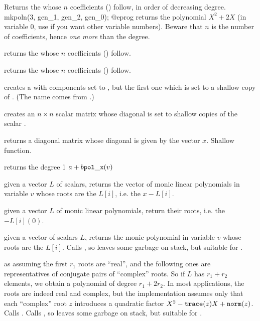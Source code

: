  Returns the  whose $n$
coefficients () follow, in order of decreasing degree.
\bprog
  mkpoln(3, gen_1, gen_2, gen_0);
@eprog
\noindent returns the polynomial $X^2 + 2X$ (in variable $0$, use
 if you want other variable numbers). Beware that $n$ is the
number of coefficients, hence \emph{one more} than the degree.

 returns the  whose $n$
coefficients () follow.

 returns the  whose $n$
coefficients () follow.

 creates a  with 
components set to , but the first one which is set to a shallow
copy of . (The name comes from .)

 creates an $n\times n$
scalar matrix whose diagonal is set to shallow copies of the scalar .

 returns a diagonal matrix whose diagonal
is given by the vector $x$. Shallow function.

 returns the degree 1
 $a + b {\tt pol\_x}(v)$


 given a vector $L$ of scalars,
returns the vector of monic linear polynomials in variable $v$ whose roots
are the $L[i]$, i.e. the $x - L[i]$.

 given a vector $L$ of monic linear
polynomials, return their roots, i.e. the $- L[i](0)$.

 given a vector of scalars $L$,
returns the monic polynomial in variable $v$ whose roots are the $L[i]$.
Calls , so leaves some garbage on stack, but suitable for
.

 as 
assuming the first $r_1$ roots are ``real'', and the following ones are
representatives of conjugate pairs of ``complex'' roots. So if $L$ has $r_1 +
r_2$ elements, we obtain a polynomial of degree $r_1 + 2r_2$. In most
applications, the roots are indeed real and complex, but the implementation
assumes only that each ``complex'' root $z$ introduces a quadratic
factor $X^2 - {\tt trace}(z) X + {\tt norm}(z)$. Calls
.
Calls , so leaves some garbage on stack, but suitable for
.

